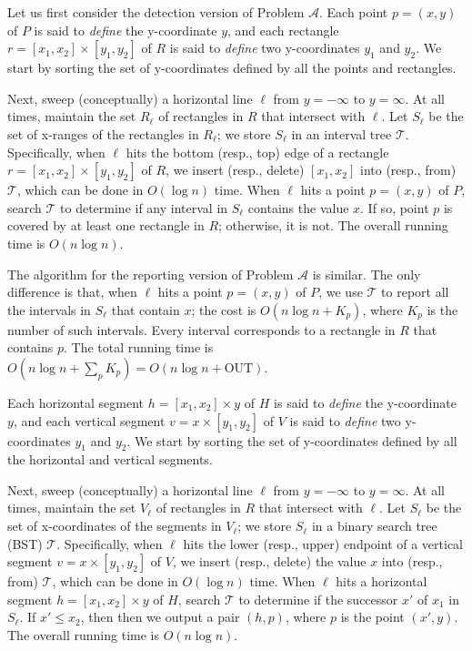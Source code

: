 \documentclass[sigconf]{acmart}
\def\vgap{\vspace{0mm}}
\def\extraspacing{\vspace{1.5mm} \noindent}
\def\T{\mathcal{T}}
\def\out{\mathrm{OUT}}
\begin{document}
{{{\vgap

Let us first consider the detection version of Problem $\mathscr{A}$. Each point $p = (x, y)$ of $P$ is said to {\em define} the y-coordinate $y$, and each rectangle $r = [x_1, x_2] \times [y_1, y_2]$ of $R$ is said to {\em define} two y-coordinates $y_1$ and $y_2$. We start by sorting the set of y-coordinates defined by all the points and rectangles.

\vgap

Next, sweep (conceptually) a horizontal line $\ell$ from $y = -\infty$ to $y = \infty$. At all times, maintain the set $R_\ell$ of rectangles in $R$ that intersect with $\ell$. Let $S_\ell$ be the set of x-ranges of the rectangles in $R_\ell$; we store $S_\ell$ in an interval tree $\T$. Specifically, when $\ell$ hits the bottom (resp., top) edge of a rectangle $r = [x_1, x_2] \times [y_1, y_2]$ of $R$, we insert (resp., delete) $[x_1, x_2]$ into (resp., from) $\T$, which can be done in $O(\log n)$ time. When $\ell$ hits a point $p = (x, y)$ of $P$, search $\T$ to determine if any interval in $S_\ell$ contains the value $x$. If so, point $p$ is covered by at least one rectangle in $R$; otherwise, it is not. The overall running time is $O(n \log n)$.

\vgap

The algorithm for the reporting version of Problem $\mathscr{A}$ is similar. The only difference is that, when $\ell$ hits a point $p = (x, y)$ of $P$, we use $\T$ to report all the intervals in $S_\ell$ that contain $x$; the cost is $O(n \log n + K_p)$, where $K_p$ is the number of such intervals. Every interval corresponds to a rectangle in $R$ that contains $p$. The total running time is $O(n \log n + \sum_p K_p) = O(n \log n + \out)$.

\extraspacing {\bf Algorithm for Problem $\bm{\mathscr{B}}$.} Each horizontal segment $h = [x_1, x_2] \times y$ of $H$ is said to {\em define} the y-coordinate $y$, and each vertical segment $v = x \times [y_1, y_2]$ of $V$ is said to {\em define} two y-coordinates $y_1$ and $y_2$. We start by sorting the set of y-coordinates defined by all the horizontal and vertical segments.

\vgap

Next, sweep (conceptually) a horizontal line $\ell$ from $y = -\infty$ to $y = \infty$. At all times, maintain the set $V_\ell$ of rectangles in $R$ that intersect with $\ell$. Let $S_\ell$ be the set of x-coordinates of the segments in $V_\ell$; we store $S_\ell$ in a binary search tree (BST) $\T$. Specifically, when $\ell$ hits the lower  (resp., upper) endpoint of a vertical segment $v = x \times [y_1, y_2]$ of $V$, we insert (resp., delete) the value $x$ into (resp., from) $\T$, which can be done in $O(\log n)$ time. When $\ell$ hits a horizontal segment $h = [x_1, x_2] \times y$ of $H$, search $\T$ to determine if the successor $x'$ of $x_1$ in $S_\ell$. If $x' \le x_2$, then then we output a pair $(h, p)$, where $p$ is the point $(x', y)$. The overall running time is $O(n \log n)$.

}}}
\end{document}
